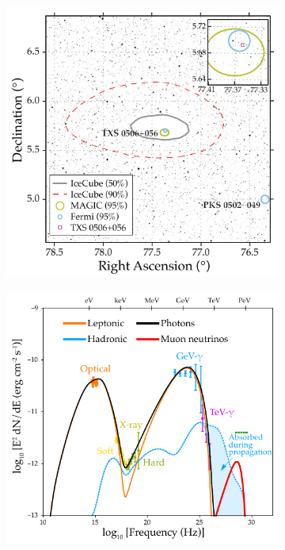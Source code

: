 \documentclass[
    a4paper, %
    fontsize=10pt, %
    twoside=false, %
    numbers=noenddot, %
    fontmethod=tex,
]{kaobook}
\begin{document}
\begin{figure}[htb]
\centering
    \begin{subfigure}[b]{0.47\textwidth}
    \centering
    \includegraphics[width=1\textwidth]{theory/txs_localization.pdf}
    \end{subfigure}
    \begin{subfigure}[b]{0.52\textwidth}
    \centering
    \includegraphics[width=1\textwidth]{theory/txs_modeling.pdf}

\end{subfigure}
\end{figure}
\end{document}
